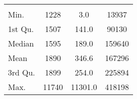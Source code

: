 \begin{tabular}{lS[table-format=5.1]S[table-format=5.1]S[table-format=5.1]}
&  &  &  \\
 Min.    & 1228 & 3.0 & 13937 \\
 1st Qu. & 1507 & 141.0 & 90130 \\
 Median  & 1595 & 189.0 & 159640 \\
 Mean    & 1890 & 346.6 & 167296 \\
 3rd Qu. & 1899 & 254.0 & 225894 \\
 Max.    & 11740 & 11301.0 & 418198 \\
\end{tabular}
